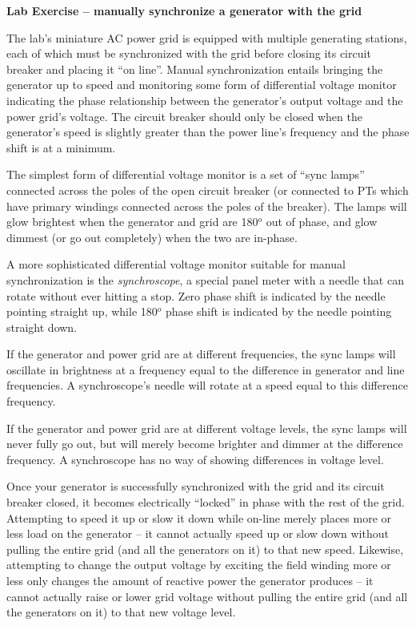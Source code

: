 \vfil \eject

\noindent
{\bf Lab Exercise -- manually synchronize a generator with the grid}

\vskip 5pt

The lab's miniature AC power grid is equipped with multiple generating stations, each of which must be synchronized with the grid before closing its circuit breaker and placing it ``on line''.  Manual synchronization entails bringing the generator up to speed and monitoring some form of differential voltage monitor indicating the phase relationship between the generator's output voltage and the power grid's voltage.  The circuit breaker should only be closed when the generator's speed is slightly greater than the power line's frequency and the phase shift is at a minimum.

\vskip 10pt

The simplest form of differential voltage monitor is a set of ``sync lamps'' connected across the poles of the open circuit breaker (or connected to PTs which have primary windings connected across the poles of the breaker).  The lamps will glow brightest when the generator and grid are 180$^{o}$ out of phase, and glow dimmest (or go out completely) when the two are in-phase.

\vskip 10pt

A more sophisticated differential voltage monitor suitable for manual synchronization is the {\it synchroscope}, a special panel meter with a needle that can rotate without ever hitting a stop.  Zero phase shift is indicated by the needle pointing straight up, while 180$^{o}$ phase shift is indicated by the needle pointing straight down.

\vskip 10pt

If the generator and power grid are at different frequencies, the sync lamps will oscillate in brightness at a frequency equal to the difference in generator and line frequencies.  A synchroscope's needle will rotate at a speed equal to this difference frequency.

If the generator and power grid are at different voltage levels, the sync lamps will never fully go out, but will merely become brighter and dimmer at the difference frequency.  A synchroscope has no way of showing differences in voltage level.

\vskip 10pt

Once your generator is successfully synchronized with the grid and its circuit breaker closed, it becomes electrically ``locked'' in phase with the rest of the grid.  Attempting to speed it up or slow it down while on-line merely places more or less load on the generator -- it cannot actually speed up or slow down without pulling the entire grid (and all the generators on it) to that new speed.  Likewise, attempting to change the output voltage by exciting the field winding more or less only changes the amount of reactive power the generator produces -- it cannot actually raise or lower grid voltage without pulling the entire grid (and all the generators on it) to that new voltage level.

